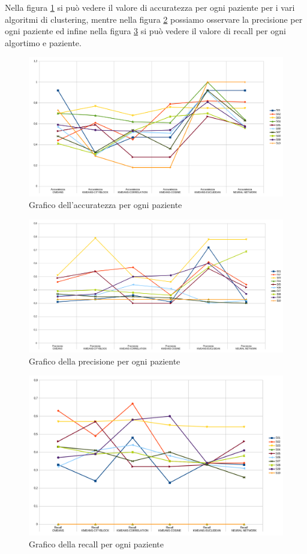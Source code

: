 Nella figura \ref{Accuratezza} si può vedere il valore di accuratezza per ogni paziente per i vari algoritmi di clustering, mentre nella figura \ref{Precisione} possiamo osservare la precisione per ogni paziente ed infine nella figura \ref{Recall} si può vedere il valore di recall per ogni algortimo e paziente.
\begin{figure}[]
	\centering
	\includegraphics[scale=0.35]{images/accuratezza.png}
	\caption{Grafico dell'accuratezza per ogni paziente}
	\label{Accuratezza}
\end{figure}
\begin{figure}[]
	\centering
	\includegraphics[scale=0.3]{images/precisione.png}
	\caption{Grafico della precisione per ogni paziente}
	\label{Precisione}
\end{figure}
\begin{figure}[]
	\centering
	\includegraphics[scale=0.35]{images/recall.png}
	\caption{Grafico della recall per ogni paziente}
	\label{Recall}
\end{figure}
